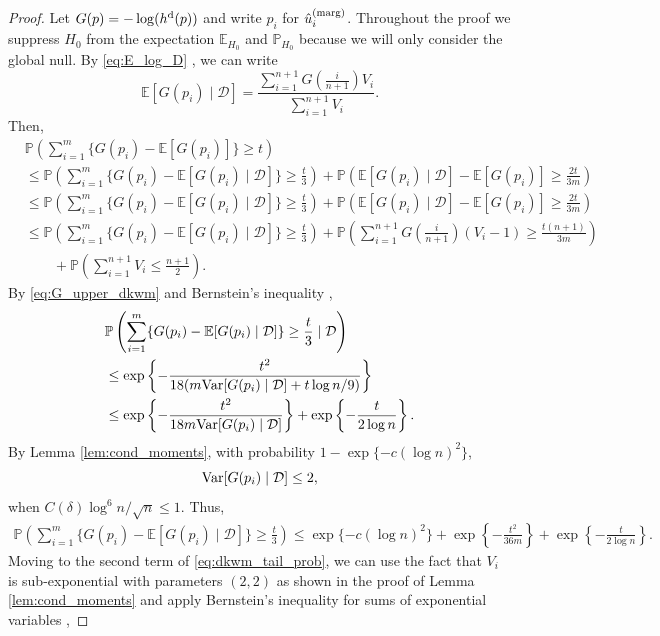 \documentclass[11pt]{article}
\newcommand{\Var}{\textnormal{Var}}
\def\E{\mathbb{E}}
\def\marg{\textnormal{(marg)}}
\def\dkwm{\textnormal{d}}
\renewcommand{\P}{\mathbb{P}}
\newcommand{\D}{\mathcal{D}}
\newcommand{\lb}{\left(}
\newcommand{\rb}{\right)}
\begin{document}
\begin{proof}
   Let $G(p) = -\log (h^\dkwm(p))$ and write $p_i$ for $\hat{u}^\marg_i$. Throughout the proof we suppress $H_0$ from the expectation $\E_{H_0}$ and $\P_{H_0}$ because we will only consider the global null. By \eqref{eq:E_log_D} , we can write 
  \[\E[G(p_i)\mid \D] = \frac{\sum_{i=1}^{n+1}G\left(\frac{i}{n+1}\right)V_{i}}{\sum_{i=1}^{n+1}V_{i}}.\]
  Then, 
  \begin{align}
    &\P\lb \sum_{i=1}^{m}\{G(p_i) - \E[G(p_i)]\}\ge t\rb\nonumber\\
    & \le \P\lb \sum_{i=1}^{m}\{G(p_i) - \E[G(p_i)\mid \D]\}\ge \frac{t}{3}\rb + \P\lb \E[G(p_i)\mid \D] - \E[G(p_i)]\ge \frac{2t}{3m}\rb\nonumber\\
    & \le \P\lb \sum_{i=1}^{m}\{G(p_i) - \E[G(p_i)\mid \D]\}\ge \frac{t}{3}\rb + \P\lb \E[G(p_i)\mid \D] - \E[G(p_i)]\ge \frac{2t}{3m}\rb\nonumber\\
    & \le \P\lb \sum_{i=1}^{m}\{G(p_i) - \E[G(p_i)\mid \D]\}\ge \frac{t}{3}\rb + \P\lb \sum_{i=1}^{n+1}G\left(\frac{i}{n+1}\right)(V_{i} - 1)\ge \frac{t(n+1)}{3m}\rb\nonumber\\
    & \qquad+ \P\lb \sum_{i=1}^{n+1}V_{i} \le \frac{n+1}{2}\rb.\label{eq:dkwm_tail_prob}
  \end{align}
  By \eqref{eq:G_upper_dkwm} and Bernstein's inequality \citep[e.g.,][equation (2.10)]{boucheron2013concentration},
  \begin{align*}
    &\P\lb \sum_{i=1}^{m}\{G(p_i) - \E[G(p_i)\mid \D]\}\ge \frac{t}{3}\mid \D\rb\\
    &\le \exp\left\{-\frac{t^2}{18(m\Var[G(p_i)\mid \D] + t\log n / 9)}\right\}\\
    & \le \exp \left\{-\frac{t^2}{18m\Var[G(p_i)\mid \D]}\right\} + \exp\left\{-\frac{t}{2\log n}\right\}.
  \end{align*}
  By Lemma \ref{lem:cond_moments}, with probability $1 - \exp\{-c(\log n)^2\}$, 
  \[\Var[G(p_i)\mid \D] \le 2,\]
  when $C(\delta)\log^6 n / \sqrt{n}\le 1$. Thus,
  \begin{align}
    \label{eq:term1_dkwm_tail_prob}
    \P\lb \sum_{i=1}^{m}\{G(p_i) - \E[G(p_i)\mid \D]\}\ge \frac{t}{3}\rb\le \exp\{-c(\log n)^2\} + \exp \left\{-\frac{t^2}{36m}\right\} + \exp\left\{-\frac{t}{2\log n}\right\}.
  \end{align}
  Moving to the second term of \eqref{eq:dkwm_tail_prob}, we can use the fact that $V_i$ is sub-exponential with parameters $(2,2)$ as shown in the proof of Lemma \ref{lem:cond_moments} and apply Bernstein's inequality for sums of exponential variables \citep[e.g.,][Proposition 2.9]{wainwright2019high},

\end{proof}
\end{document}

